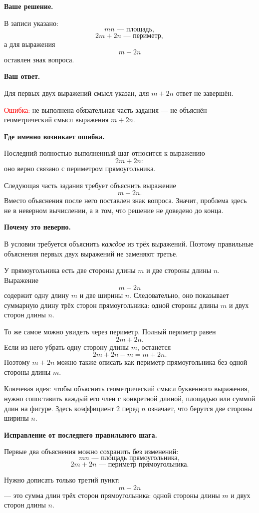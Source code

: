 \documentclass[12pt,a4paper]{article}
\begin{document}
\textbf{Ваше решение.}

В записи указано:
\[
mn \text{ --- площадь},
\]
\[
2m+2n \text{ --- периметр},
\]
а для выражения
\[
m+2n
\]
оставлен знак вопроса.

\textbf{Ваш ответ.}

Для первых двух выражений смысл указан, для $m+2n$ ответ не завершён.

\textcolor{red}{Ошибка:} не выполнена обязательная часть задания --- не объяснён геометрический смысл выражения $m+2n$.

\textbf{Где именно возникает ошибка.}

Последний полностью выполненный шаг относится к выражению
\[
2m+2n:
\]
оно верно связано с периметром прямоугольника.

Следующая часть задания требует объяснить выражение
\[
m+2n.
\]
Вместо объяснения после него поставлен знак вопроса. Значит, проблема здесь не в неверном вычислении, а в том, что решение не доведено до конца.

\textbf{Почему это неверно.}

В условии требуется объяснить \emph{каждое} из трёх выражений. Поэтому правильные объяснения первых двух выражений не заменяют третье.

У прямоугольника есть две стороны длины $m$ и две стороны длины $n$. Выражение
\[
m+2n
\]
содержит одну длину $m$ и две ширины $n$. Следовательно, оно показывает суммарную длину трёх сторон прямоугольника: одной стороны длины $m$ и двух сторон длины $n$.

То же самое можно увидеть через периметр. Полный периметр равен
\[
2m+2n.
\]
Если из него убрать одну сторону длины $m$, останется
\[
2m+2n-m=m+2n.
\]
Поэтому $m+2n$ можно также описать как периметр прямоугольника без одной стороны длины $m$.

\textcolor{blue!60!black}{Ключевая идея:} чтобы объяснить геометрический смысл буквенного выражения, нужно сопоставить каждый его член с конкретной длиной, площадью или суммой длин на фигуре. Здесь коэффициент $2$ перед $n$ означает, что берутся две стороны ширины $n$.

\textbf{Исправление от последнего правильного шага.}

Первые два объяснения можно сохранить без изменений:
\[
mn \text{ --- площадь прямоугольника},
\]
\[
2m+2n \text{ --- периметр прямоугольника}.
\]

Нужно дописать только третий пункт:
\[
m+2n
\]
--- это сумма длин трёх сторон прямоугольника: одной стороны длины $m$ и двух сторон длины $n$.
\end{document}
